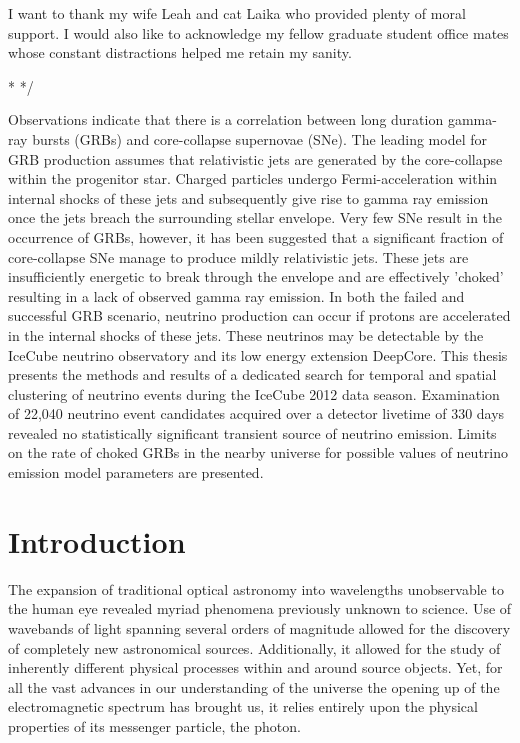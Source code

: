 \documentclass{gatech-thesis}
\begin{document}
\begin{preliminary}
\begin{acknowledgements}
I want to thank my wife Leah and cat Laika who provided plenty of moral support. I would also like to acknowledge my fellow graduate student office mates whose constant distractions helped me retain my sanity.
\end{acknowledgements}
\contents

\begin{summary}

\long{}
\/*
*/

Observations indicate that there is a correlation between long duration gamma-ray bursts (GRBs) and core-collapse supernovae (SNe).  The leading model for GRB production assumes that relativistic jets are generated by the core-collapse within the progenitor star.  Charged particles undergo Fermi-acceleration within internal shocks of these jets and subsequently give rise to gamma ray emission once the jets breach the surrounding stellar envelope.  Very few SNe result in the occurrence of GRBs, however, it has been suggested that a significant fraction of core-collapse SNe manage to produce mildly relativistic jets.  These jets are insufficiently energetic to break through the envelope and are effectively 'choked' resulting in a lack of observed gamma ray emission.  In both the failed and successful GRB scenario, neutrino production can occur if protons are accelerated in the internal shocks of these jets.  These neutrinos may be detectable by the IceCube neutrino observatory and its low energy extension DeepCore. This thesis presents the methods and results of a dedicated search for temporal and spatial clustering of neutrino events during the IceCube 2012 data season. Examination of 22,040 neutrino event candidates acquired over a detector livetime of 330 days revealed no statistically significant transient source of neutrino emission. Limits on the rate of choked GRBs in the nearby universe for possible values of neutrino emission model parameters are presented.


\end{summary}

\end{preliminary}
\chapter{Introduction}
The expansion of traditional optical astronomy into wavelengths unobservable to the human eye revealed myriad phenomena previously unknown to science. Use of wavebands of light spanning several orders of magnitude allowed for the discovery of completely new astronomical sources. Additionally, it allowed for the study of inherently different physical processes within and around source objects. Yet, for all the vast advances in our understanding of the universe the opening up of the electromagnetic spectrum has brought us, it relies entirely upon the physical properties of its messenger particle, the photon.
\end{document}
